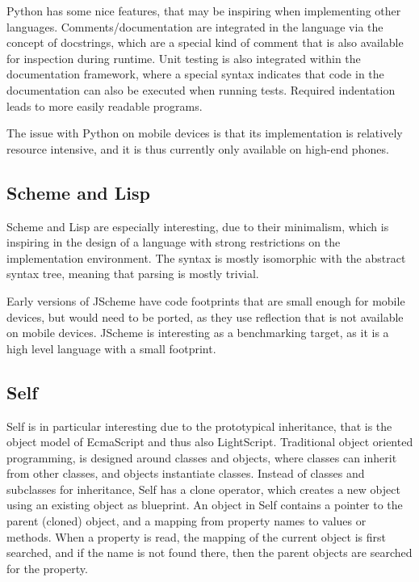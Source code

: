 \documentclass[11pt]{report}
\begin{document}
Python has some nice features, that may be inspiring when implementing other languages. Comments/documentation are integrated in the language via the concept of docstrings, which are a special kind of comment that is also available for inspection during runtime. Unit testing is also integrated within the documentation framework, where a special syntax indicates that code in the documentation can also be executed when running tests.
Required indentation leads to more easily readable programs.

The issue with Python on mobile devices is that its implementation is relatively resource intensive, and it is thus currently only available on high-end phones.

\subsection{Scheme and Lisp}
Scheme and Lisp are especially interesting, due to their minimalism, which is inspiring in the design of a language with strong restrictions on the implementation environment.
The syntax is mostly isomorphic with the abstract syntax tree, meaning that parsing is mostly trivial.

Early versions of JScheme\cite{norvig-jscheme} have code footprints that are small enough for mobile devices, but would need to be ported, as they use reflection that is not available on mobile devices.
JScheme is interesting as a benchmarking target, as it is a high level language with a small footprint.


\subsection{Self}
\label{survey-self}
Self \cite{self} is in particular interesting due to the prototypical inheritance, that is the object model of EcmaScript and thus also LightScript.
Traditional object oriented programming, is designed around classes and objects, where classes can inherit from other classes, and objects instantiate classes.
Instead of classes and subclasses for inheritance, Self has a clone operator, which creates a new object using an existing object as blueprint.
An object in Self contains a pointer to the parent (cloned) object, and a mapping from property names to values or methods. When a property is read, the mapping of the current object is first searched, and if the name is not found there, then the parent objects are searched for the property.
\end{document}
